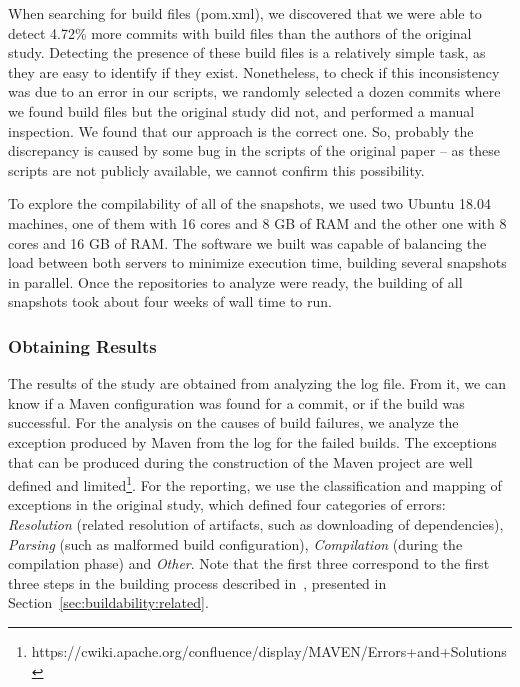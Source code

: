 When searching for build files (pom.xml), we discovered that we were able to detect 4.72\% more commits with build files than the authors of the original study.
Detecting the presence of these build files is a relatively simple task, as they are easy to identify if they exist.
Nonetheless, to check if this inconsistency was due to an error in our scripts, we randomly selected a dozen commits where we found build files but the original study did not, and performed a manual inspection.
We found that our approach is the correct one.
So, probably the discrepancy is caused by some bug in the scripts of the original paper -- as these scripts are not publicly available, we cannot confirm this possibility.

To explore the compilability of all of the snapshots, we used two Ubuntu 18.04 machines, one of them with 16 cores and 8 GB of RAM and the other one with 8 cores and 16 GB of RAM. The software we built was capable of balancing the load between both servers to minimize execution time, building several snapshots in parallel. Once the repositories to analyze were ready, the building of all snapshots took about four weeks of wall time to run.

\subsubsection{Obtaining Results}

The results of the study are obtained from analyzing the log file. From it, we can know if a Maven configuration was found for a commit, or if the build was successful. For the analysis on the causes of build failures, we analyze the exception produced by Maven from the log for the failed builds. The exceptions that can be produced during the construction of the Maven project are well defined and limited\footnote{https://cwiki.apache.org/confluence/display/MAVEN/Errors+and+Solutions}. For the reporting, we use the classification and mapping of exceptions in the original study, which defined four categories of errors: \textit{Resolution} (related resolution of artifacts, such as downloading of dependencies), \textit{Parsing} (such as malformed build configuration), \textit{Compilation} (during the compilation phase) and \textit{Other}. Note that the first three correspond to the first three steps in the building process described in~\cite{Sulir:2016:QSJ:3001878.3001882}, presented in Section~\ref{sec:buildability:related}.

